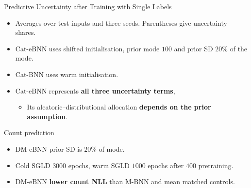 \begin{frame}{Predictive Uncertainty after Training with Single Labels}
\label{frm:appendix-single-label-terms}
\begin{itemize}
\item Averages over test inputs and three seeds. Parentheses give uncertainty shares.
\item Cat-eBNN uses shifted initialisation, prior mode $100$ and prior SD $20\%$ of the mode.
\item Cat-BNN uses warm initialisation. 
\item Cat-eBNN represents \textbf{all three uncertainty terms}, 
\begin{itemize}
\item Its aleatoric--distributional allocation \textbf{depends on the prior assumption}.
\end{itemize}
\end{itemize}
\end{frame}

\begin{frame}{Count prediction}
\label{frm:backup-count-prediction}
\begin{itemize}
\item DM-eBNN prior SD is $20\%$ of mode.
\item Cold SGLD $3000$ epochs, warm SGLD $1000$ epochs after $400$ pretraining.
\item DM-eBNN \textbf{lower count NLL} than M-BNN and  mean matched controls.
\end{itemize}
\end{frame}

